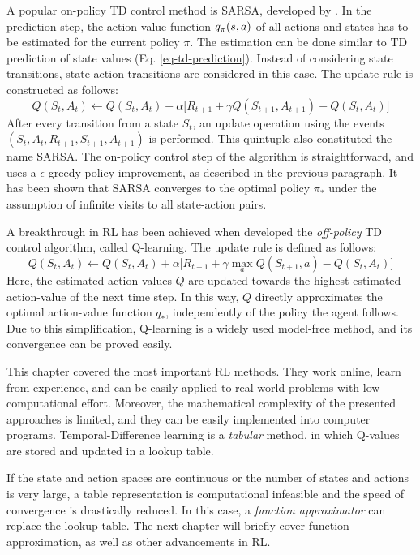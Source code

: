\documentclass[a4paper, twoside, 12pt]{article}
\let\textcite\shortciteA
\begin{document}
A popular on-policy TD control method is SARSA, developed by
\textcite{rummery94_q}. In the prediction step, the action-value function
\(q_\pi(s,a)\) of all actions and states has to be estimated for the current
policy \(\pi\). The estimation can be done similar to TD prediction of state
values (Eq. \ref{eq-td-prediction}). Instead of considering state transitions,
state-action transitions are considered in this case. The update rule is
constructed as follows:
\begin{equation} \label{eq-sarsa}
    Q(S_t, A_t) \leftarrow Q(S_t,A_t) + \alpha\big[R_{t+1}+\gamma Q(S_{t+1},A_{t+1}) - Q(S_t, A_t)\big]
\end{equation}
After every transition from a state \(S_t\), an update operation using the events
\((S_t, A_t, R_{t+1}, S_{t+1}, A_{t+1})\) is performed. This quintuple also
constituted the name SARSA. The on-policy control step of the algorithm is
straightforward, and uses a \(\epsilon\)-greedy policy improvement, as described in
the previous paragraph. It has been shown that SARSA converges to the optimal
policy \(\pi_*\) under the assumption of infinite visits to all state-action
pairs.

A breakthrough in RL has been achieved when \textcite{watkins92_q_learn} developed
the \emph{off-policy} TD control algorithm, called Q-learning. The update rule is
defined as follows:
\begin{equation} \label{eq-q-learning}
    Q(S_t, A_t) \leftarrow Q(S_t,A_t) + \alpha\big[R_{t+1}+\gamma\max_a Q(S_{t+1},a) - Q(S_t, A_t)\big]
\end{equation}
Here, the estimated action-values \(Q\) are updated towards the highest estimated
action-value of the next time step. In this way, \(Q\) directly approximates the
optimal action-value function \(q_*\), independently of the policy the agent
follows. Due to this simplification, Q-learning is a widely used model-free
method, and its convergence can be proved easily.

This chapter covered the most important RL methods. They work online,
learn from experience, and can be easily applied to real-world problems
with low computational effort. Moreover, the mathematical complexity of the
presented approaches is limited, and they can be easily implemented into
computer programs. Temporal-Difference learning is a \emph{tabular} method, in which
Q-values are stored and updated in a lookup table.

If the state and action spaces are continuous or the number of states and actions is
very large, a table representation is computational infeasible and the speed of
convergence is drastically reduced. In this case, a \emph{function approximator} can
replace the lookup table. The next chapter will briefly cover function approximation,
as well as other advancements in RL.
\end{document}
